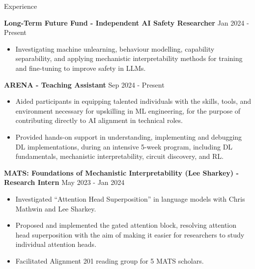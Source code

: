 \documentclass[hidelinks]{resume} %
\begin{document}
\begin{rSection}{Experience}
    
\textbf{Long-Term Future Fund - Independent AI Safety Researcher}
\hfill {Jan 2024 - Present}
\begin{itemize}
    \item Investigating machine unlearning, behaviour modelling, capability separability, and applying mechanistic interpretability methods for training and fine-tuning to improve safety in LLMs.
\end{itemize}

\textbf{ARENA - Teaching Assistant}
\hfill{Sep 2024 - Present}
\begin{itemize}
    \item Aided participants in equipping talented individuals with the skills, tools, and environment necessary for upskilling in ML engineering, for the purpose of contributing directly to AI alignment in technical roles.
    \item Provided hands-on support in understanding, implementing and debugging DL implementations, during an intensive 5-week program, including DL fundamentals, mechanistic interpretability, circuit discovery, and RL.
\end{itemize}

\textbf{MATS: Foundations of Mechanistic Interpretability (Lee Sharkey) - Research Intern}
\hfill {May 2023 - Jan 2024}
\begin{itemize}
    \item Investigated ``Attention Head Superposition'' in language models with Chris Mathwin and Lee Sharkey.
    \item Proposed and implemented the gated attention block, resolving attention head superposition with the aim of making it easier for researchers to study individual attention heads.
    \item Facilitated Alignment 201 reading group for 5 MATS scholars.
\end{itemize}


\end{rSection}
\end{document}
